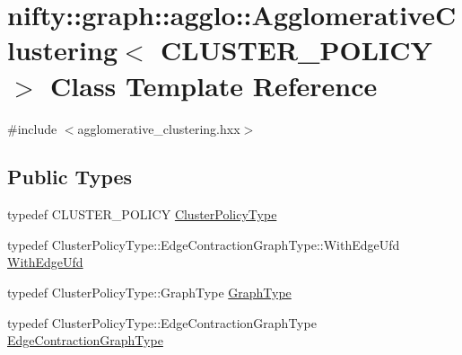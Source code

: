\hypertarget{classnifty_1_1graph_1_1agglo_1_1AgglomerativeClustering}{}\section{nifty\+:\+:graph\+:\+:agglo\+:\+:Agglomerative\+Clustering$<$ C\+L\+U\+S\+T\+E\+R\+\_\+\+P\+O\+L\+I\+C\+Y $>$ Class Template Reference}
\label{classnifty_1_1graph_1_1agglo_1_1AgglomerativeClustering}


{\ttfamily \#include $<$agglomerative\+\_\+clustering.\+hxx$>$}

\subsection*{Public Types}
\begin{DoxyCompactItemize}
\item 
typedef C\+L\+U\+S\+T\+E\+R\+\_\+\+P\+O\+L\+I\+C\+Y \hyperlink{classnifty_1_1graph_1_1agglo_1_1AgglomerativeClustering_a3a678ecd37725f2c0f8ec56857768034}{Cluster\+Policy\+Type}
\item 
typedef Cluster\+Policy\+Type\+::\+Edge\+Contraction\+Graph\+Type\+::\+With\+Edge\+Ufd \hyperlink{classnifty_1_1graph_1_1agglo_1_1AgglomerativeClustering_ad271a88b3736ec7b3d6a4e47e718828a}{With\+Edge\+Ufd}
\item 
typedef Cluster\+Policy\+Type\+::\+Graph\+Type \hyperlink{classnifty_1_1graph_1_1agglo_1_1AgglomerativeClustering_a0c735105592b55c036be76e3d7fc735f}{Graph\+Type}
\item 
typedef Cluster\+Policy\+Type\+::\+Edge\+Contraction\+Graph\+Type \hyperlink{classnifty_1_1graph_1_1agglo_1_1AgglomerativeClustering_ab50801119fbdb9ed78884a64f872e1d8}{Edge\+Contraction\+Graph\+Type}
\end{DoxyCompactItemize}
